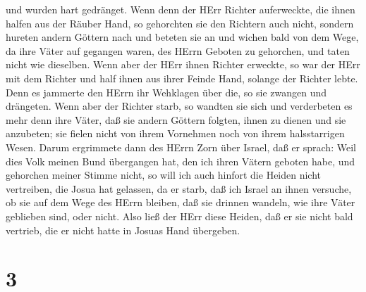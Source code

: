 und wurden hart gedränget.  Wenn denn der HErr Richter
auferweckte, die ihnen halfen aus der Räuber Hand,  so
gehorchten sie den Richtern auch nicht, sondern hureten andern Göttern
nach und beteten sie an und wichen bald von dem Wege, da ihre Väter auf
gegangen waren, des HErrn Geboten zu gehorchen, und taten nicht wie
dieselben.  Wenn aber der HErr ihnen Richter erweckte, so
war der HErr mit dem Richter und half ihnen aus ihrer Feinde Hand,
solange der Richter lebte. Denn es jammerte den HErrn ihr Wehklagen über
die, so sie zwangen und drängeten.  Wenn aber der Richter
starb, so wandten sie sich und verderbeten es mehr denn ihre Väter, daß
sie andern Göttern folgten, ihnen zu dienen und sie anzubeten; sie
fielen nicht von ihrem Vornehmen noch von ihrem halsstarrigen Wesen.
 Darum ergrimmete dann des HErrn Zorn über Israel, daß er
sprach: Weil dies Volk meinen Bund übergangen hat, den ich ihren Vätern
geboten habe, und gehorchen meiner Stimme nicht,  so will
ich auch hinfort die Heiden nicht vertreiben, die Josua hat gelassen, da
er starb,  daß ich Israel an ihnen versuche, ob sie auf dem
Wege des HErrn bleiben, daß sie drinnen wandeln, wie ihre Väter
geblieben sind, oder nicht.  Also ließ der HErr diese
Heiden, daß er sie nicht bald vertrieb, die er nicht hatte in Josuas
Hand übergeben.

\hypertarget{section-2}{%
\section{3}\label{section-2}}


